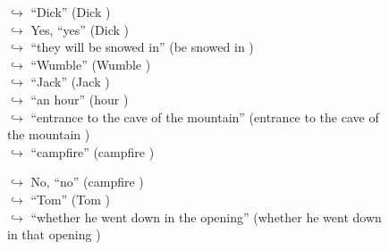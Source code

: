 \documentclass[11pt,a4paper, onecolumn]{article}
\begin{document}
\begin{figure}[t] \small \begin{tcolorbox}[boxsep=0pt,left=5pt,right=0pt,top=2pt,colback = yellow!5] \begin{dialogue}
 \small 
\colorbox{pink!25}{$\hookrightarrow$}
{ ``Dick'' (Dick ) }
\\
\colorbox{pink!25}{$\hookrightarrow$}
\colorbox{red!25}{Yes,}
{ ``yes'' (Dick ) }
\\
\colorbox{pink!25}{$\hookrightarrow$}
{ ``they will be snowed in'' (be snowed in ) }
\\
\colorbox{pink!25}{$\hookrightarrow$}
{ ``Wumble'' (Wumble ) }
\\
\colorbox{pink!25}{$\hookrightarrow$}
{ ``Jack'' (Jack ) }
\\
\colorbox{pink!25}{$\hookrightarrow$}
{ ``an hour'' (hour ) }
\\
\colorbox{pink!25}{$\hookrightarrow$}
{ ``entrance to the cave of the mountain'' (entrance to the cave of the mountain ) }
\\
\colorbox{pink!25}{$\hookrightarrow$}
{ ``campfire'' (campfire ) }
 \end{dialogue}\end{tcolorbox}\end{figure}\begin{figure}[t] \small \begin{tcolorbox}[boxsep=0pt,left=5pt,right=0pt,top=2pt,colback = yellow!5] \begin{dialogue}
 \small 
\colorbox{pink!25}{$\hookrightarrow$}
\colorbox{red!25}{No,}
{ ``no'' (campfire ) }
\\
\colorbox{pink!25}{$\hookrightarrow$}
{ ``Tom'' (Tom ) }
\\
\colorbox{pink!25}{$\hookrightarrow$}
{ ``whether he went down in the opening'' (whether he went down in that opening ) }

\end{dialogue}
\end{tcolorbox}
\end{figure}
\end{document}

